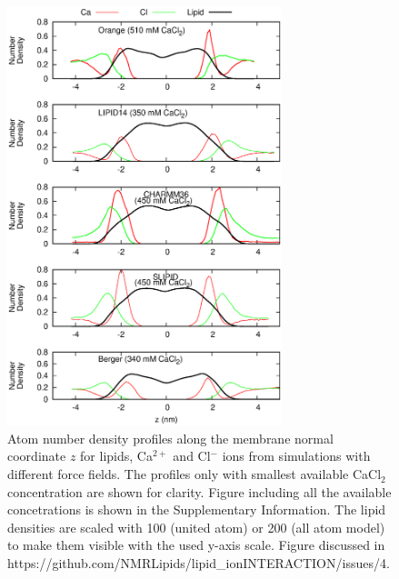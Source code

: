 \documentclass[pre,aps,floatfix,authordate1-4,twocolumn]{revtex4-1}
\begin{document}

\begin{figure}[]
  \centering
  \includegraphics[width=8cm]{../Fig/CAdensitiesCLEAR.eps}
  \caption{\label{CAdensitiesCLEAR}
    Atom number density profiles along the membrane normal coordinate $z$ for lipids, Ca$^{2+}$ and Cl$^-$ ions from simulations with different force fields.
    The profiles only with smallest available CaCl$_2$ concentration are shown for clarity.
    Figure including all the available concetrations is shown in the Supplementary Information.
    The lipid densities are scaled with 100 (united atom) or 200 (all atom model) to make them visible with the used y-axis scale.
    Figure discussed in https://github.com/NMRLipids/lipid\_ionINTERACTION/issues/4.
  }
\end{figure}
\end{document}
